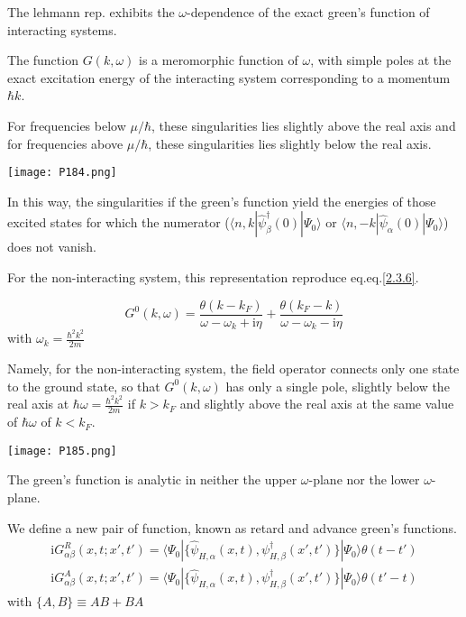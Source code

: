 The lehmann rep. exhibits the $\omega$-dependence of the exact green's function of interacting systems.

The function $G(k,\omega)$ is a meromorphic function of $\omega$, with simple poles at the exact excitation energy of the interacting system corresponding to a momentum $\hbar k$.

For frequencies below $\mu/\hbar$, these singularities lies slightly above the real axis and for frequencies above $\mu/\hbar$, these singularities  lies slightly below the real axis.

\begin{center}
\texttt{[image: P184.png]}
\end{center}
In this way, the singularities if the green's function yield the energies of those excited states for which the numerator ($\langle n,k|\hat \psi^{
\dagger}_{\beta} (0)|\Psi_0\rangle$ or $\langle n,-k|\hat \psi_{\alpha}(0)|\Psi_0\rangle$) does not vanish. 

For the non-interacting system, this representation reproduce eq.eq.\eqref{2.3.6}.

\begin{equation}
G^0(k,\omega)=\frac{\theta(k-k_F)}{\omega-\omega_k+\mathrm{i}\eta}+\frac{\theta(k_F-k)}{\omega-\omega_k-\mathrm{i}\eta} \nonumber
\end{equation} 
with $\omega_k=\frac{\hbar^2k^2}{2m}$

Namely, for the non-interacting system, the field operator connects only one state to the ground state, so that $G^0(k,\omega)$ has only a single pole, slightly below the real axis at $\hbar \omega=\frac{\hbar^2k^2}{2m}$ if $k>k_F$ and slightly above the real axis at the same value of $\hbar \omega$ of $k<k_F$.


\begin{center}
\texttt{[image: P185.png]}
\end{center}

The green's function is analytic in neither the upper $\omega$-plane nor the lower $\omega$-plane.

We define a new pair of function, known as retard and advance green's functions.
\begin{align}\label{2.3.13}
\mathrm{i}G^R_{\alpha\beta}(x,t;x',t')=\langle \Psi_0|\{\hat \psi_{H,\alpha}(x,t),\psi^{\dagger}_{H,\beta}(x',t')\}|\Psi_0\rangle\theta(t-t')
\end{align}
\begin{align}\label{2.3.14}
\mathrm{i}G^A_{\alpha\beta}(x,t;x',t')=\langle \Psi_0|\{\hat \psi_{H,\alpha}(x,t),\psi^{\dagger}_{H,\beta}(x',t')\}|\Psi_0\rangle\theta(t'-t)
\end{align}
with $\{A,B\}\equiv AB+BA$

